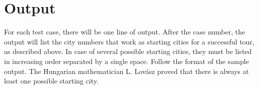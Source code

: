 \section*{Output}

      For each test case, there will be one line of output. After the case number, the output will list the city numbers that work as starting cities for a successful tour, as described above. In case of several possible starting cities, they must be listed in increasing order separated by a single space. Follow the format of the sample output. The Hungarian mathematician L. Lovász proved that there is always at least one possible starting city.
